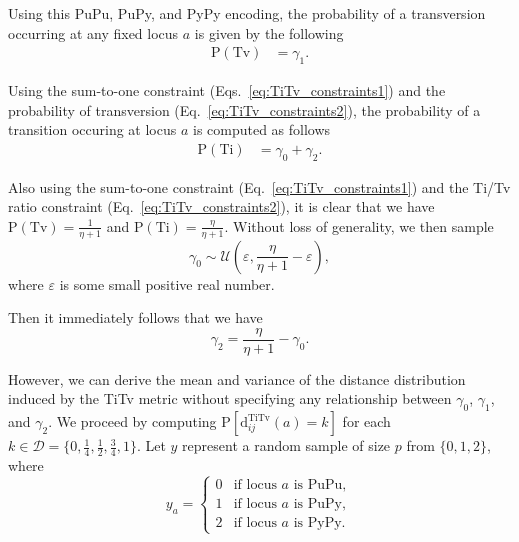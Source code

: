 \documentclass[10pt,letterpaper]{article}
\begin{document}
Using this PuPu, PuPy, and PyPy encoding, the probability of a transversion occurring at any fixed locus $a$ is given by the following
%
\begin{equation}\label{eq:prob_Tv}
\begin{aligned}
\text{P}(\text{Tv}) &= \gamma_1.
\end{aligned}
\end{equation}

Using the sum-to-one constraint (Eqs.~\ref{eq:TiTv_constraints1}) and the probability of transversion (Eq.~\ref{eq:TiTv_constraints2}), the probability of a transition occuring at locus $a$ is computed as follows
%
\begin{equation}\label{eq:prob_Ti}
\begin{aligned}
\text{P}(\text{Ti}) &= \gamma_0 + \gamma_2.
\end{aligned}
\end{equation}

Also using the sum-to-one constraint (Eq.~\ref{eq:TiTv_constraints1}) and the Ti/Tv ratio constraint (Eq.~\ref{eq:TiTv_constraints2}), it is clear that we have $\text{P}(\text{Tv}) = \frac{1}{\eta + 1}$ and $\text{P}(\text{Ti}) = \frac{\eta}{\eta + 1}$. Without loss of generality, we then sample 
%
\begin{equation}\label{eq:gamma0}
\gamma_0 \sim \mathcal{U}\left(\varepsilon,\frac{\eta}{\eta + 1} - \varepsilon\right),
\end{equation}
%
where $\varepsilon$ is some small positive real number.

Then it immediately follows that we have 
%
\begin{equation}\label{eq:gamma2}
\gamma_2 = \frac{\eta}{\eta + 1} - \gamma_0.
\end{equation}

However, we can derive the mean and variance of the distance distribution induced by the TiTv metric without specifying any relationship between $\gamma_0$, $\gamma_1$, and $\gamma_2$. We proceed by computing $\text{P}\left[\text{d}^\text{TiTv}_{ij}(a) = k\right]$ for each $k \in \mathcal{D} = \bigl\{0,\frac{1}{4},\frac{1}{2},\frac{3}{4},1\bigr\}$. Let $y$ represent a random sample of size $p$ from $\{0,1,2\}$, where 
%
\begin{equation}\label{eq:yvec}
y_a = \begin{cases}
0 & \text{if locus } a \text{ is PuPu}, \\
1 & \text{if locus } a \text{ is PuPy}, \\
2 & \text{if locus } a \text{ is PyPy}.
\end{cases}
\end{equation}
\end{document}
